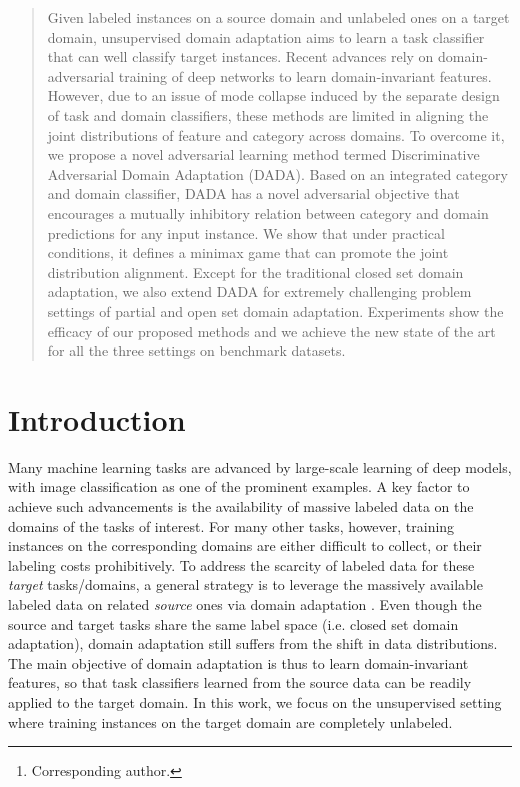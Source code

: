 \documentclass[letterpaper]{article} \usepackage{aaai20}  \usepackage{times}  \usepackage{helvet} \usepackage{courier}  \usepackage[hyphens]{url}  \usepackage{graphicx} \urlstyle{rm} \def\UrlFont{\rm}  \usepackage{graphicx}  \frenchspacing  \setlength{\pdfpagewidth}{8.5in}  \setlength{\pdfpageheight}{11in}
\author{Hui Tang, Kui Jia\thanks{Corresponding author.}\\ South China University of Technology\\
eehuitang@mail.scut.edu.cn, kuijia@scut.edu.cn }
\begin{document}
\maketitle

\begin{abstract}
Given labeled instances on a source domain and unlabeled ones on a target domain, unsupervised domain adaptation aims to learn a task classifier that can well classify target instances. Recent advances rely on domain-adversarial training of deep networks to learn domain-invariant features. However, due to an issue of mode collapse induced by the separate design of task and domain classifiers, these methods are limited in aligning the joint distributions of feature and category across domains. To overcome it, we propose a novel adversarial learning method termed Discriminative Adversarial Domain Adaptation (DADA). Based on an integrated category and domain classifier, DADA has a novel adversarial objective that encourages a mutually inhibitory relation between category and domain predictions for any input instance. We show that under practical conditions, it defines a minimax game that can promote the joint distribution alignment. Except for the traditional closed set domain adaptation, we also extend DADA for extremely challenging problem settings of partial and open set domain adaptation. Experiments show the efficacy of our proposed methods and we achieve the new state of the art for all the three settings on benchmark datasets.
\end{abstract}

\section{Introduction}

Many machine learning tasks are advanced by large-scale learning of deep models, with image classification \cite{imagenet} as one of the prominent examples. A key factor to achieve such advancements is the availability of massive labeled data on the domains of the tasks of interest. For many other tasks, however, training instances on the corresponding domains are either difficult to collect, or their labeling costs prohibitively. To address the scarcity of labeled data for these \emph{target} tasks/domains, a general strategy is to leverage the massively available labeled data on related \emph{source} ones via domain adaptation \cite{tl_survey}. Even though the source and target tasks share the same label space (i.e. closed set domain adaptation), domain adaptation still suffers from the shift in data distributions. The main objective of domain adaptation is thus to learn domain-invariant features, so that task classifiers learned from the source data can be readily applied to the target domain. In this work, we focus on the unsupervised setting where training instances on the target domain are completely unlabeled.
\end{document}
